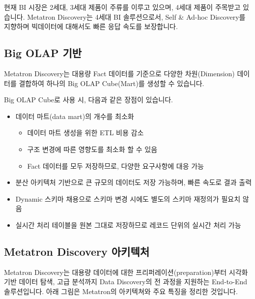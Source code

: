 \documentclass[letterpaper,10pt,english]{sphinxmanual}
\begin{document}
현재 BI 시장은 2세대, 3세대 제품이 주류를 이루고 있으며, 4세대 제품이 주목받고 있습니다. Metatron Discovery는 4세대 BI 솔루션으로서, Self \& Ad-hoc Discovery를 지향하며 빅데이터에 대해서도 빠른 응답 속도를 보장합니다.


\subsection{Big OLAP 기반}
\label{\detokenize{discovery/part01/overview:big-olap}}
Metatron Discovery는 대용량 Fact 데이터를 기준으로 다양한 차원(Dimension) 데이터를 결합하여 하나의 Big OLAP Cube(Mart)를 생성할 수 있습니다.
\begin{quote}

\begin{figure}[H]
\centering

\noindent{}
\end{figure}
\end{quote}

Big OLAP Cube로 사용 시, 다음과 같은 장점이 있습니다.
\begin{itemize}
\item {} 
데이터 마트(data mart)의 개수를 최소화
\begin{itemize}
\item {} 
데이터 마트 생성을 위한 ETL 비용 감소

\item {} 
구조 변경에 따른 영향도를 최소화 할 수 있음

\item {} 
Fact 데이터를 모두 저장하므로, 다양한 요구사항에 대응 가능

\end{itemize}

\item {} 
분산 아키텍처 기반으로 큰 규모의 데이터도 저장 가능하며, 빠른 속도로 결과 출력

\item {} 
Dynamic 스키마 채용으로 스키마 변경 시에도 별도의 스키마 재정의가 필요치 않음

\item {} 
실시간 처리 테이블을 원본 그대로 저장하므로 레코드 단위의 실시간 처리 가능

\end{itemize}


\subsection{Metatron Discovery 아키텍처}
\label{\detokenize{discovery/part01/overview:id1}}
Metatron Discovery는 대용량 데이터에 대한 프리퍼레이션(preparation)부터 시각화 기반 데이터 탐색, 고급 분석까지 Data Discovery의 전 과정을 지원하는 End-to-End 솔루션입니다. 아래 그림은 Metatron의 아키텍쳐와 주요 특징을 정리한 것입니다.
\begin{quote}

\begin{figure}[H]
\centering

\noindent{}
\end{figure}
\end{quote}
\end{document}
